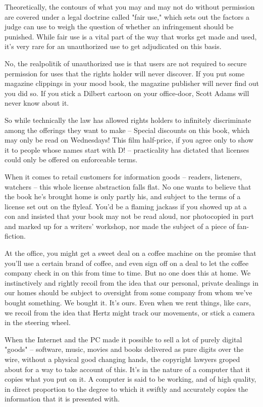 Theoretically, the contours of what you may and may not do without
permission are covered under a legal doctrine called "fair use,"
which sets out the factors a judge can use to weigh the question of
whether an infringement should be punished. While fair use is a
vital part of the way that works get made and used, it's very rare
for an unauthorized use to get adjudicated on this basis.

No, the realpolitik of unauthorized use is that users are not
required to secure permission for uses that the rights holder will
never discover. If you put some magazine clippings in your mood
book, the magazine publisher will never find out you did so. If you
stick a Dilbert cartoon on your office-door, Scott Adams will never
know about it.

So while technically the law has allowed rights holders to
infinitely discriminate among the offerings they want to make --
Special discounts on this book, which may only be read on
Wednesdays! This film half-price, if you agree only to show it to
people whose names start with D! -- practicality has dictated that
licenses could only be offered on enforceable terms.

When it comes to retail customers for information goods -- readers,
listeners, watchers -- this whole license abstraction falls flat.
No one wants to believe that the book he's brought home is only
partly his, and subject to the terms of a license set out on the
flyleaf. You'd be a flaming jackass if you showed up at a con and
insisted that your book may not be read aloud, nor photocopied in
part and marked up for a writers' workshop, nor made the subject of
a piece of fan-fiction.

At the office, you might get a sweet deal on a coffee machine on
the promise that you'll use a certain brand of coffee, and even
sign off on a deal to let the coffee company check in on this from
time to time. But no one does this at home. We instinctively and
rightly recoil from the idea that our personal, private dealings in
our homes should be subject to oversight from some company from
whom we've bought something. We bought it. It's ours. Even when we
rent things, like cars, we recoil from the idea that Hertz might
track our movements, or stick a camera in the steering wheel.

When the Internet and the PC made it possible to sell a lot of
purely digital "goods" -- software, music, movies and books
delivered as pure digits over the wire, without a physical good
changing hands, the copyright lawyers groped about for a way to
take account of this. It's in the nature of a computer that it
copies what you put on it. A computer is said to be working, and of
high quality, in direct proportion to the degree to which it
swiftly and accurately copies the information that it is presented
with.

